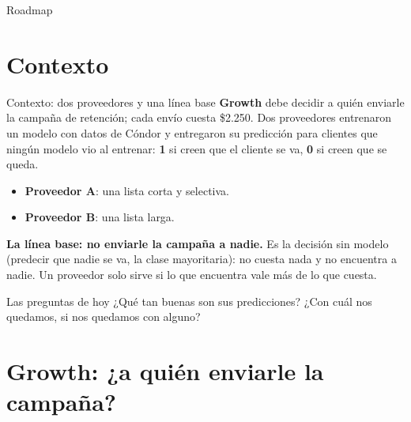 \documentclass{beamer}
\begin{document}
\begin{frame}[noframenumbering]{Roadmap}
\tableofcontents
\end{frame}

\section{Contexto}

\begin{frame}{Contexto: dos proveedores y una línea base}
\small
\textbf{Growth} debe decidir a quién enviarle la campaña de retención; cada envío cuesta \$2.250. Dos proveedores entrenaron un modelo con datos de Cóndor y entregaron su predicción para clientes que ningún modelo vio al entrenar: \textbf{1} si creen que el cliente se va, \textbf{0} si creen que se queda.
\begin{itemize} \setlength{\itemsep}{0.08cm}
  \item \textbf{Proveedor A}: una lista corta y selectiva.
  \item \textbf{Proveedor B}: una lista larga.
\end{itemize}

\vspace{0.1cm}
\textbf{La línea base: no enviarle la campaña a nadie.} Es la decisión sin modelo (predecir que nadie se va, la clase mayoritaria): no cuesta nada y no encuentra a nadie. Un proveedor solo sirve si lo que encuentra vale más de lo que cuesta.

\vspace{0.15cm}
\begin{block}{Las preguntas de hoy}
¿Qué tan buenas son sus predicciones? ¿Con cuál nos quedamos, si nos quedamos con alguno?
\end{block}
\end{frame}

\section{Growth: ¿a quién enviarle la campaña?}
\end{document}
